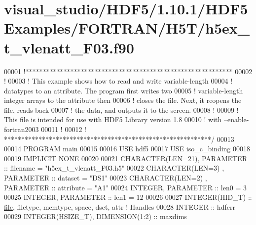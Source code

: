 \hypertarget{visual__studio_2_h_d_f5_21_810_81_2_h_d_f5_examples_2_f_o_r_t_r_a_n_2_h5_t_2h5ex__t__vlenatt___f03_8f90_source}{}\section{visual\+\_\+studio/\+H\+D\+F5/1.10.1/\+H\+D\+F5\+Examples/\+F\+O\+R\+T\+R\+A\+N/\+H5\+T/h5ex\+\_\+t\+\_\+vlenatt\+\_\+\+F03.f90}
\label{visual__studio_2_h_d_f5_21_810_81_2_h_d_f5_examples_2_f_o_r_t_r_a_n_2_h5_t_2h5ex__t__vlenatt___f03_8f90_source}

\begin{DoxyCode}
00001 \textcolor{comment}{!************************************************************}
00002 \textcolor{comment}{!}
00003 \textcolor{comment}{!  This example shows how to read and write variable-length}
00004 \textcolor{comment}{!  datatypes to an attribute.  The program first writes two}
00005 \textcolor{comment}{!  variable-length integer arrays to the attribute then}
00006 \textcolor{comment}{!  closes the file.  Next, it reopens the file, reads back}
00007 \textcolor{comment}{!  the data, and outputs it to the screen.}
00008 \textcolor{comment}{!}
00009 \textcolor{comment}{!  This file is intended for use with HDF5 Library version 1.8}
00010 \textcolor{comment}{!  with --enable-fortran2003 }
00011 \textcolor{comment}{!}
00012 \textcolor{comment}{! ************************************************************/}
00013 
00014 \textcolor{keyword}{PROGRAM} main
00015 
00016   \textcolor{keywordtype}{USE }hdf5
00017   \textcolor{keywordtype}{USE }iso\_c\_binding
00018   
00019   \textcolor{keywordtype}{IMPLICIT NONE}
00020 
00021   \textcolor{keywordtype}{CHARACTER(LEN=21)}, \textcolor{keywordtype}{PARAMETER} :: filename  = \textcolor{stringliteral}{"h5ex\_t\_vlenatt\_F03.h5"}
00022   \textcolor{keywordtype}{CHARACTER(LEN=3)} , \textcolor{keywordtype}{PARAMETER} :: dataset   = \textcolor{stringliteral}{"DS1"}
00023   \textcolor{keywordtype}{CHARACTER(LEN=2)} , \textcolor{keywordtype}{PARAMETER} :: attribute = \textcolor{stringliteral}{"A1"}
00024   \textcolor{keywordtype}{INTEGER}, \textcolor{keywordtype}{PARAMETER} :: len0 = 3
00025   \textcolor{keywordtype}{INTEGER}, \textcolor{keywordtype}{PARAMETER} :: len1 = 12
00026 
00027   \textcolor{keywordtype}{INTEGER(HID\_T)}  :: \hyperlink{structfile}{file}, filetype, memtype, space, dset, attr \textcolor{comment}{! Handles}
00028   \textcolor{keywordtype}{INTEGER} :: hdferr
00029   \textcolor{keywordtype}{INTEGER(HSIZE\_T)}, \textcolor{keywordtype}{DIMENSION(1:2)}   :: maxdims

\end{DoxyCode}
